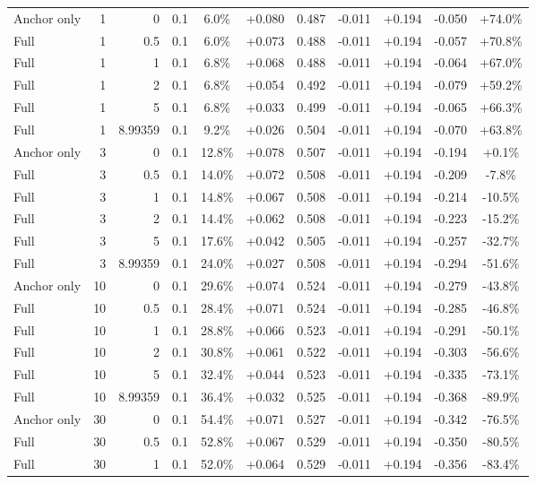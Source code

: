 \begin{table}[htbp]
\begin{tabular}{lrrrccccccc}
Anchor only & 1 & 0 & 0.1 & 6.0\% & +0.080 & 0.487 & -0.011 & +0.194 & -0.050 & +74.0\% \\
Full & 1 & 0.5 & 0.1 & 6.0\% & +0.073 & 0.488 & -0.011 & +0.194 & -0.057 & +70.8\% \\
Full & 1 & 1 & 0.1 & 6.8\% & +0.068 & 0.488 & -0.011 & +0.194 & -0.064 & +67.0\% \\
Full & 1 & 2 & 0.1 & 6.8\% & +0.054 & 0.492 & -0.011 & +0.194 & -0.079 & +59.2\% \\
Full & 1 & 5 & 0.1 & 6.8\% & +0.033 & 0.499 & -0.011 & +0.194 & -0.065 & +66.3\% \\
Full & 1 & 8.99359 & 0.1 & 9.2\% & +0.026 & 0.504 & -0.011 & +0.194 & -0.070 & +63.8\% \\
Anchor only & 3 & 0 & 0.1 & 12.8\% & +0.078 & 0.507 & -0.011 & +0.194 & -0.194 & +0.1\% \\
Full & 3 & 0.5 & 0.1 & 14.0\% & +0.072 & 0.508 & -0.011 & +0.194 & -0.209 & -7.8\% \\
Full & 3 & 1 & 0.1 & 14.8\% & +0.067 & 0.508 & -0.011 & +0.194 & -0.214 & -10.5\% \\
Full & 3 & 2 & 0.1 & 14.4\% & +0.062 & 0.508 & -0.011 & +0.194 & -0.223 & -15.2\% \\
Full & 3 & 5 & 0.1 & 17.6\% & +0.042 & 0.505 & -0.011 & +0.194 & -0.257 & -32.7\% \\
Full & 3 & 8.99359 & 0.1 & 24.0\% & +0.027 & 0.508 & -0.011 & +0.194 & -0.294 & -51.6\% \\
Anchor only & 10 & 0 & 0.1 & 29.6\% & +0.074 & 0.524 & -0.011 & +0.194 & -0.279 & -43.8\% \\
Full & 10 & 0.5 & 0.1 & 28.4\% & +0.071 & 0.524 & -0.011 & +0.194 & -0.285 & -46.8\% \\
Full & 10 & 1 & 0.1 & 28.8\% & +0.066 & 0.523 & -0.011 & +0.194 & -0.291 & -50.1\% \\
Full & 10 & 2 & 0.1 & 30.8\% & +0.061 & 0.522 & -0.011 & +0.194 & -0.303 & -56.6\% \\
Full & 10 & 5 & 0.1 & 32.4\% & +0.044 & 0.523 & -0.011 & +0.194 & -0.335 & -73.1\% \\
Full & 10 & 8.99359 & 0.1 & 36.4\% & +0.032 & 0.525 & -0.011 & +0.194 & -0.368 & -89.9\% \\
Anchor only & 30 & 0 & 0.1 & 54.4\% & +0.071 & 0.527 & -0.011 & +0.194 & -0.342 & -76.5\% \\
Full & 30 & 0.5 & 0.1 & 52.8\% & +0.067 & 0.529 & -0.011 & +0.194 & -0.350 & -80.5\% \\
Full & 30 & 1 & 0.1 & 52.0\% & +0.064 & 0.529 & -0.011 & +0.194 & -0.356 & -83.4\% \\

\end{tabular}
\end{table}
